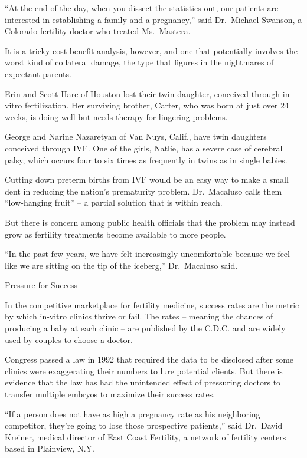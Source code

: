 ﻿\documentclass[12pt]{article}
\begin{document}
``At the end of the day, when you dissect the statistics out, our patients are interested in
establishing a family and a pregnancy,'' said Dr.~Michael Swanson, a Colorado fertility doctor who
treated Ms.~Mastera.

It is a tricky cost-benefit analysis, however, and one that potentially involves the worst kind of
collateral damage, the type that figures in the nightmares of expectant parents.

Erin and Scott Hare of Houston lost their twin daughter, conceived through in-vitro fertilization.
Her surviving brother, Carter, who was born at just over 24 weeks, is doing well but needs therapy
for lingering problems.

George and Narine Nazaretyan of Van Nuys, Calif., have twin daughters conceived through IVF. One of
the girls, Natlie, has a severe case of cerebral palsy, which occurs four to six times as frequently
in twins as in single babies.

Cutting down preterm births from IVF would be an easy way to make a small dent in reducing the
nation's prematurity problem. Dr.~Macaluso calls them ``low-hanging fruit'' -- a partial solution
that is within reach.

But there is concern among public health officials that the problem may instead grow as fertility
treatments become available to more people.

``In the past few years, we have felt increasingly uncomfortable because we feel like we are sitting
on the tip of the iceberg,'' Dr.~Macaluso said.

Pressure for Success

In the competitive marketplace for fertility medicine, success rates are the metric by which
in-vitro clinics thrive or fail. The rates -- meaning the chances of producing a baby at each clinic
-- are published by the C.D.C. and are widely used by couples to choose a doctor.

Congress passed a law in 1992 that required the data to be disclosed after some clinics were
exaggerating\cite{exaggerate} their numbers to lure potential clients. But there is evidence that
the law has had the unintended effect of pressuring doctors to transfer multiple embryos to maximize
their success rates.

``If a person does not have as high a pregnancy rate as his neighboring competitor, they're going to
lose those prospective patients,'' said Dr.~David Kreiner, medical director of East Coast Fertility,
a network of fertility centers based in Plainview, N.Y.
\end{document}
